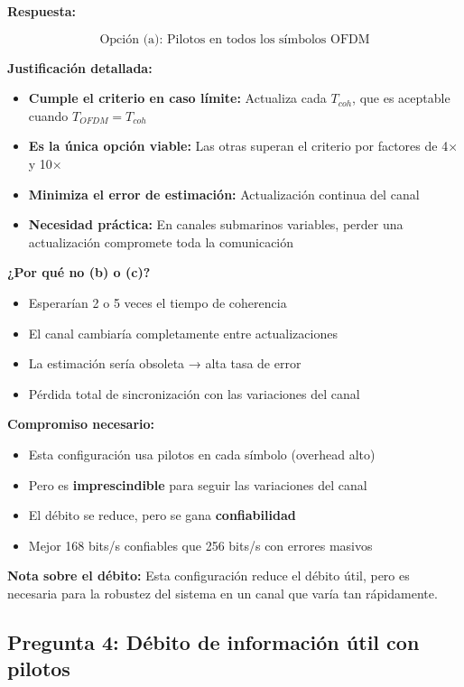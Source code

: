 \documentclass[11pt,a4paper]{article}
\begin{document}
\textbf{Respuesta:}

\[
\boxed{\text{Opción (a): Pilotos en todos los símbolos OFDM}}
\]

\textbf{Justificación detallada:}
\begin{itemize}
    \item \textbf{Cumple el criterio en caso límite:} Actualiza cada $T_{coh}$, que es aceptable cuando $T_{OFDM} = T_{coh}$
    \item \textbf{Es la única opción viable:} Las otras superan el criterio por factores de 4× y 10×
    \item \textbf{Minimiza el error de estimación:} Actualización continua del canal
    \item \textbf{Necesidad práctica:} En canales submarinos variables, perder una actualización compromete toda la comunicación
\end{itemize}

\textbf{¿Por qué no (b) o (c)?}
\begin{itemize}
    \item Esperarían 2 o 5 veces el tiempo de coherencia
    \item El canal cambiaría completamente entre actualizaciones
    \item La estimación sería obsoleta → alta tasa de error
    \item Pérdida total de sincronización con las variaciones del canal
\end{itemize}

\textbf{Compromiso necesario:}
\begin{itemize}
    \item Esta configuración usa pilotos en cada símbolo (overhead alto)
    \item Pero es \textbf{imprescindible} para seguir las variaciones del canal
    \item El débito se reduce, pero se gana \textbf{confiabilidad}
    \item Mejor 168 bits/s confiables que 256 bits/s con errores masivos
\end{itemize}

\textbf{Nota sobre el débito:} Esta configuración reduce el débito útil, pero es necesaria para la robustez del sistema en un canal que varía tan rápidamente.

\subsection*{Pregunta 4: Débito de información útil con pilotos}
\end{document}
